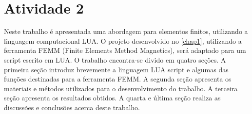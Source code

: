 \chapter{Atividade 2}
\label{chap2}
Neste trabalho é apresentada uma abordagem para elementos finitos, utilizando a linguagem computacional LUA. O projeto desenvolvido no \ref{chap1}, utilizando a ferramenta FEMM (Finite Elements Method Magnetics), será adaptado para um script escrito em LUA. O trabalho encontra-se divido em quatro seções. A primeira seção introduz brevemente a linguagem LUA script e algumas das funções destinadas para a ferramenta FEMM. A segunda seção apresenta os materiais e métodos utilizados para o desenvolvimento do trabalho. A terceira seção apresenta os resultados obtidos. A quarta e última seção realiza as discussões e conclusões acerca deste trabalho.
\newpage
\pagebreak




